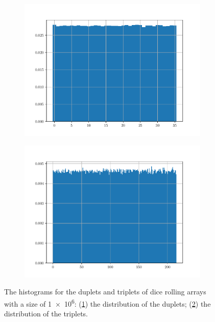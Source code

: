 \documentclass[paper=a4, fontsize=11pt]{scrartcl} %
\numberwithin{equation}{section} %
\numberwithin{figure}{section} %
\numberwithin{table}{section} %
\begin{document}
\begin{figure}[!ht]
	\centering
	\begin{subfigure}[b]{0.495\textwidth}
		\centering
		\includegraphics[width=\linewidth]{figure_1_a.pdf}
		\caption{}
		\label{fig:dice_1:a}
	\end{subfigure}
	\begin{subfigure}[b]{0.495\textwidth}
		\centering
		\includegraphics[width=\linewidth]{figure_1_b.pdf}
		\caption{}
		\label{fig:dice_1:b}
	\end{subfigure}
	\caption{The histograms for the duplets and triplets of dice rolling arrays with a size of \num{1e6}: (\ref{fig:dice_1:a}) the distribution of the duplets; (\ref{fig:dice_1:b}) the distribution of the triplets.}
	\label{fig:dice_1}
\end{figure}
\end{document}

